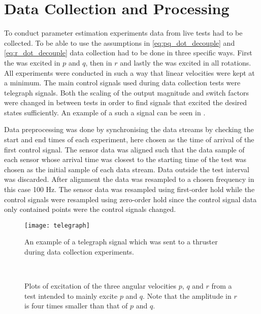 \section{Data Collection and Processing} 
To conduct parameter estimation experiments data from live tests had to be collected. To be able to use the assumptions in \eqref{eq:pq_dot_decouple} and \eqref{eq:r_dot_decouple} data collection had to be done in three specific ways.
First the \abbrROV was excited in $p$ and $q$, then in $r$ and lastly the \abbrROV was excited in all rotations.
All experiments were conducted in such a way that linear velocities were kept at a minimum.
The main control signals used during data collection tests were telegraph signals. Both the scaling of the output magnitude and switch factors were changed in between tests in order to find signals that excited the desired states sufficiently. An example of a such a signal can be seen in .

Data preprocessing was done by synchronising the data streams by checking the start and end times of each experiment, here chosen as the time of arrival of the first control signal. The sensor data was aligned such that the data sample of each sensor whose arrival time was closest to the starting time of the test was chosen as the initial sample of each data stream. Data outside the test interval was discarded. After alignment the data was resampled to a chosen frequency in this case 100 Hz. The sensor data was resampled using first-order hold while the control signals were resampled using zero-order hold since the control signal data only contained points were the control signals changed.  

\begin{figure}[tbp]
\centering
\texttt{[image: telegraph]}
\caption{An example of a telegraph signal which was sent to a thruster during data collection experiments.}
\label{fig:telegraph}
\end{figure}


\begin{figure}[tbp]
  \centering
  \qquad
  \\
  \caption{\label{fig:pqTest}%
 Plots of excitation of the three angular velocities $p$, $q$ and $r$ from a test intended to mainly excite $p$ and $q$. Note that the amplitude in $r$ is four times smaller than that of $p$ and $q$.}
\end{figure}


